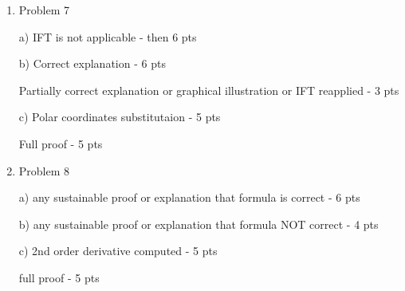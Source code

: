 \begin{enumerate}
    
    
    \item Problem 7
    
    a) IFT is not applicable - then 6 pts
    
    b) Correct explanation - 6 pts
        
        Partially correct explanation or graphical illustration or IFT reapplied - 3 pts
    
    c) Polar coordinates substitutaion - 5 pts
        
        Full proof - 5 pts

    \item Problem 8
    
    a) any sustainable proof or explanation that formula is correct - 6 pts
    
    b) any sustainable proof or explanation that formula NOT correct - 4 pts
    
    c) 2nd order derivative computed - 5 pts
    
        full proof - 5 pts


\end{enumerate}

